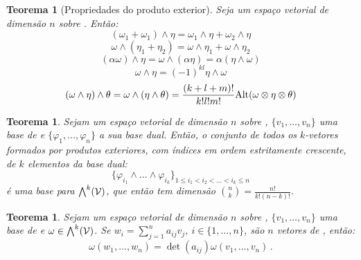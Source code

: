 \documentclass[a4paper,12pt]{extreport}
\newtheorem{myteo}[mydef]{Teorema}
\begin{document}
\begin{myteo}[Propriedades do produto exterior]
  Seja \Vcal{} um espaço vetorial de dimensão $n$ sobre \realnumb{}.
  Então:
  \begin{equation}
    (\omega_1 + \omega_1) \wedge \eta
    = \omega_1 \wedge \eta + \omega_2 \wedge \eta
  \end{equation}
  \begin{equation}
    \omega \wedge (\eta_1 + \eta_2)
    = \omega \wedge \eta_1 + \omega \wedge \eta_2
  \end{equation}
  \begin{equation}
    (\alpha \omega) \wedge \eta
    = \omega \wedge (\alpha \eta)
    = \alpha (\eta \wedge \omega)
  \end{equation}
  \begin{equation}
    \omega \wedge \eta = (-1)^{kl}\eta \wedge \omega
  \end{equation}
  \begin{equation}
    (\omega \wedge \eta) \wedge \theta
    = \omega \wedge (\eta \wedge \theta) =
    \frac{(k+l+m)!}{k!l!m!}\mathrm{Alt}(\omega \otimes \eta \otimes \theta)
  \end{equation}
\end{myteo}


\begin{myteo}
  Sejam \Vcal{} um espaço vetorial de dimensão $n$ sobre \realnumb{},
  $\{v_1, \dots, v_n\}$ uma base de \Vcal{} e
  $\{\varphi_1, \dots, \varphi_n\}$ a sua base dual.
  Então, o conjunto de todos os $k$-vetores formados por produtos
  exteriores, com índices em ordem estritamente crescente,
  de $k$ elementos da base dual:
  {\Large
    \begin{equation}
      \{ \varphi_{i_1} \wedge \dots \wedge \varphi_{i_k}\}_{
        1 \le i_1 < i_2 < \dots < i_k \le n}
    \end{equation}
  }
  é uma base para $\bigwedge^k(\mathcal{V})$,
  que então tem dimensão
  ${n \choose k} = \frac{n!}{k!(n-k)!}$.
\end{myteo}


\begin{myteo}
  Sejam \Vcal{} um espaço vetorial de dimensão $n$ sobre \realnumb{},
  $\{v_1, \dots, v_n\}$ uma base de \Vcal{} e
  $\omega \in \bigwedge^k(\mathcal{V})$.
  Se $w_i = \sum_{j=1}^n a_{ij}v_j$, $i\in \{1, \dots, n\}$,
  são $n$ vetores de \Vcal{},
  então:
  \begin{equation}
    \omega(w_1, \dots, w_n) = \det(a_{ij}) \omega(v_1, \dots, v_n)\,.
  \end{equation}
  
\end{myteo}
\end{document}
